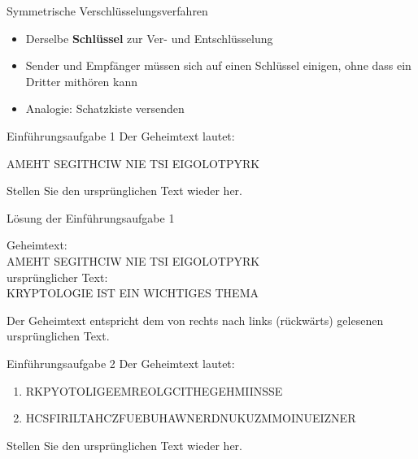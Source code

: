\begin{frame}{Symmetrische Verschlüsselungsverfahren}
    \begin{itemize}[<+->]
        \item {} Derselbe \textbf{Schlüssel} zur Ver- und Entschlüsselung
        \item {} Sender und Empfänger müssen sich auf einen Schlüssel einigen, ohne dass ein Dritter mithören kann
        \item {} Analogie: Schatzkiste versenden
    \end{itemize}

\end{frame}

\begin{frame}[label=intro1]{Einführungsaufgabe 1}
    Der Geheimtext lautet:
    \begin{center}
        AMEHT SEGITHCIW NIE TSI EIGOLOTPYRK
    \end{center}
    Stellen Sie den ursprünglichen Text wieder her.
\end{frame}

\begin{frame}[label=intro1Sol]{Lösung der Einführungsaufgabe 1}
    \begin{center}

        Geheimtext:\\
        AMEHT SEGITHCIW NIE TSI EIGOLOTPYRK\\
        \bigskip
        ursprünglicher Text:\\
        KRYPTOLOGIE IST EIN WICHTIGES THEMA\\
    \end{center}
    Der Geheimtext entspricht dem von rechts nach links (rückwärts) gelesenen ursprünglichen Text.
\end{frame}

\begin{frame}[label=intro2]{Einführungsaufgabe 2}
    Der Geheimtext lautet:
    \begin{center}
        \small
        \begin{enumerate}
            \item RKPYOTOLIGEEMREOLGCITHEGEHMIINSSE
            \item HCSFIRILTAHCZFUEBUHAWNERDNUKUZMMOINUEIZNER
        \end{enumerate}
        \normalsize
    \end{center}
    Stellen Sie den ursprünglichen Text wieder her.
\end{frame}


